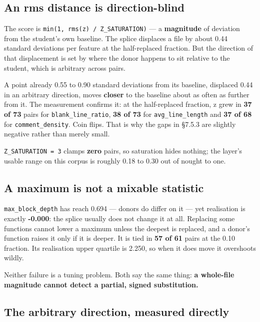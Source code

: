 \hypertarget{an-rms-distance-is-direction-blind}{%
\subsection{An rms distance is
direction-blind}\label{an-rms-distance-is-direction-blind}}

The score is \texttt{min(1,\ rms(z)\ /\ Z\_SATURATION)} --- a
\textbf{magnitude} of deviation from the student's own baseline. The
splice displaces a file by about 0.44 standard deviations per feature at
the half-replaced fraction. But the direction of that displacement is
set by where the donor happens to sit relative to the student, which is
arbitrary across pairs.

A point already 0.55 to 0.90 standard deviations from its baseline,
displaced 0.44 in an arbitrary direction, moves \textbf{closer} to the
baseline about as often as further from it. The measurement confirms it:
at the half-replaced fraction, \textbar z\textbar{} grew in \textbf{37
of 73} pairs for \texttt{blank\_line\_ratio}, \textbf{38 of 73} for
\texttt{avg\_line\_length} and \textbf{37 of 68} for
\texttt{comment\_density}. Coin flips. That is why the gaps in \S{}7.5.3
are slightly negative rather than merely small.

\texttt{Z\_SATURATION\ =\ 3} clamps \textbf{zero} pairs, so saturation
hides nothing; the layer's usable range on this corpus is roughly 0.18
to 0.30 out of nought to one.

\hypertarget{a-maximum-is-not-a-mixable-statistic}{%
\subsection{A maximum is not a mixable
statistic}\label{a-maximum-is-not-a-mixable-statistic}}

\texttt{max\_block\_depth} has reach 0.694 --- donors do differ on it
--- yet realisation is exactly \textbf{-0.000}: the splice usually does
not change it at all. Replacing some functions cannot lower a maximum
unless the deepest is replaced, and a donor's function raises it only if
it is deeper. It is tied in \textbf{57 of 61} pairs at the 0.10
fraction. Its realisation upper quartile is 2.250, so when it does move
it overshoots wildly.

Neither failure is a tuning problem. Both say the same thing: \textbf{a
whole-file magnitude cannot detect a partial, signed substitution.}

\hypertarget{the-arbitrary-direction-measured-directly}{%
\subsection{The arbitrary direction, measured
directly}\label{the-arbitrary-direction-measured-directly}}

